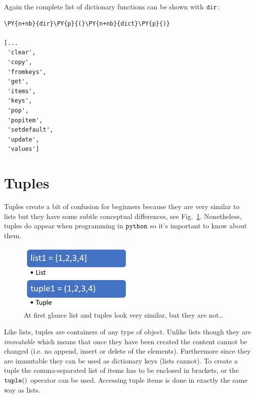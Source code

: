 Again the complete list of dictionary functions can be shown with $\tt{dir}$:

\begin{tcolorbox}[breakable, size=fbox, boxrule=1pt, pad at break*=1mm,colback=cellbackground, colframe=cellborder]
\begin{Verbatim}[commandchars=\\\{\}]
\PY{n+nb}{dir}\PY{p}{(}\PY{n+nb}{dict}\PY{p}{)}

[...
 'clear',
 'copy',
 'fromkeys',
 'get',
 'items',
 'keys',
 'pop',
 'popitem',
 'setdefault',
 'update',
 'values']
\end{Verbatim}
\end{tcolorbox}

\section{Tuples}\label{tuples}

Tuples create a bit of confusion for beginners because they are very similar to lists 
but they have some subtle conceptual differences, see Fig.~\ref{fig:tuples}.
Nonetheless, tuples do appear when programming in $\tt{python}$ so it's important to know about them.

\begin{figure}[hb]
\centering
\includegraphics[width=0.5\textwidth]{figures/Difference-Between-List-and-Tuple-fig-1-2.jpg}
\caption{At first glance list and tuples look very similar, but they are not\ldots}
\label{fig:tuples}
\end{figure}

Like lists, tuples are containers of any type of object. Unlike lists though they are 
\emph{immutable} which means that once they have been created the content cannot be 
changed (i.e. no append, insert or delete of the elements). Furthermore since they are 
immutable they can be used as dictionary keys (lists cannot).
To create a tuple the comma-separated list of items has to be enclosed in brackets, or 
the $\tt{tuple()}$ operator can be used.
Accessing tuple items is done in exactly the same way as lists.

